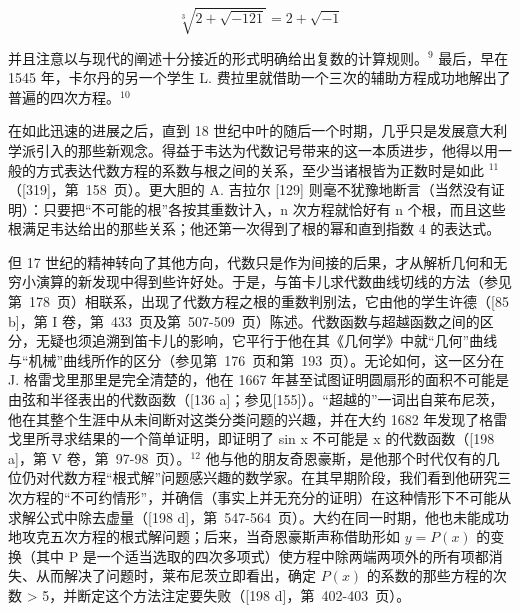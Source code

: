 \[
\sqrt [ 3 ]{2 + \sqrt {-121}} = 2 + \sqrt {-1}
\]

并且注意以与现代的阐述十分接近的形式明确给出复数的计算规则。\(^{9}\) 最后，早在 1545 年，卡尔丹的另一个学生 L. 费拉里就借助一个三次的辅助方程成功地解出了普遍的四次方程。\(^{10}\)

在如此迅速的进展之后，直到 18 世纪中叶的随后一个时期，几乎只是发展意大利学派引入的那些新观念。得益于韦达为代数记号带来的这一本质进步，他得以用一般的方式表达代数方程的系数与根之间的关系，至少当诸根皆为正数时是如此 \(^{11}\)（{[}319{]}，第~158~页）。更大胆的 A. 吉拉尔 {[}129{]} 则毫不犹豫地断言（当然没有证明）：只要把“不可能的根”各按其重数计入，n 次方程就恰好有 n 个根，而且这些根满足韦达给出的那些关系；他还第一次得到了根的幂和直到指数 4 的表达式。

但 17 世纪的精神转向了其他方向，代数只是作为间接的后果，才从解析几何和无穷小演算的新发现中得到些许好处。于是，与笛卡儿求代数曲线切线的方法（参见第~178~页）相联系，出现了代数方程之根的重数判别法，它由他的学生许德（{[}85 b{]}，第 I 卷，第~433~页及第~507-509~页）陈述。代数函数与超越函数之间的区分，无疑也须追溯到笛卡儿的影响，它平行于他在其《几何学》中就“几何”曲线与“机械”曲线所作的区分（参见第~176~页和第~193~页）。无论如何，这一区分在 J. 格雷戈里那里是完全清楚的，他在 1667 年甚至试图证明圆扇形的面积不可能是由弦和半径表出的代数函数（{[}136 a{]}；参见{[}155{]}）。“超越的”一词出自莱布尼茨，他在其整个生涯中从未间断对这类分类问题的兴趣，并在大约 1682 年发现了格雷戈里所寻求结果的一个简单证明，即证明了 sin x 不可能是 x 的代数函数（{[}198 a{]}，第 V 卷，第~97-98~页）。\(^{12}\) 他与他的朋友奇恩豪斯，是他那个时代仅有的几位仍对代数方程“根式解”问题感兴趣的数学家。在其早期阶段，我们看到他研究三次方程的“不可约情形”，并确信（事实上并无充分的证明）在这种情形下不可能从求解公式中除去虚量（{[}198 d{]}，第~547-564~页）。大约在同一时期，他也未能成功地攻克五次方程的根式解问题；后来，当奇恩豪斯声称借助形如 \(y = P(x)\) 的变换（其中 P 是一个适当选取的四次多项式）使方程中除两端两项外的所有项都消失、从而解决了问题时，莱布尼茨立即看出，确定 \(P(x)\) 的系数的那些方程的次数 \textgreater{} 5，并断定这个方法注定要失败（{[}198 d{]}，第~402-403~页）。

